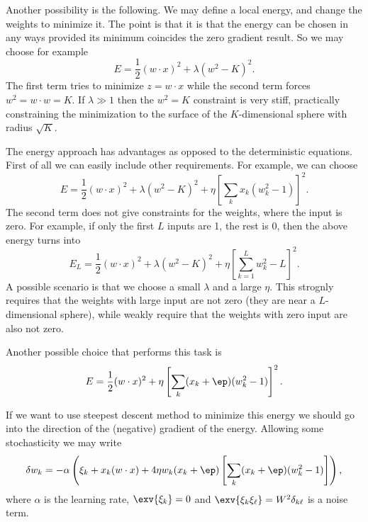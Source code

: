 \documentclass[10pt,a4paper]{article}
\begin{document}
Another possibility is the following. We may define a local energy, and change the weights to minimize it. The point is that it is that the energy can be chosen in any ways provided its minimum coincides the zero gradient result. So we may choose for example
\begin{equation}
  E = \frac12 (w\cdot x)^2 + \lambda (w^2-K)^2.
\end{equation}
The first term tries to minimize $z=w\cdot x$ while the second term forces $w^2=w\cdot w=K$. If $\lambda\gg1$ then the $w^2=K$ constraint is very stiff, practically constraining the minimization to the surface of the $K$-dimensional sphere with radius $\sqrt{K}$.

The energy approach has advantages as opposed to the deterministic equations. First of all we can easily include other requirements. For example, we can choose
\begin{equation}
  E = \frac12 (w\cdot x)^2 + \lambda (w^2-K)^2 + \eta\left[\sum_k x_k (w_k^2-1)\right]^2.
\end{equation}
The second term does not give constraints for the weights, where the input is zero. For example, if only the first $L$ inputs are 1, the rest is 0, then the above energy turns into
\begin{equation}
  E_L = \frac12 (w\cdot x)^2 + \lambda (w^2-K)^2 + \eta\left[\sum_{k=1}^L w_k^2-L\right]^2.
\end{equation}
A possible scenario is that we choose a small $\lambda$ and a large $\eta$. This strognly requires that the weights with large input are not zero (they are near a $L$-dimensional sphere), while weakly require that the weights with zero input are also not zero.

Another possible choice that performs this task is
\begin{equation}
  E = \frac12 (w\cdot x)^2 + \eta\left[\sum_k (x_k+\ep) (w_k^2-1)\right]^2.
\end{equation}

If we want to use steepest descent method to minimize this energy we should go into the direction of the (negative) gradient of the energy. Allowing some stochasticity we may write
\begin{equation}
  \delta w_k = -\alpha \left(\xi_k+ x_k (w\cdot x) + 4 \eta w_k(x_k+\ep) \left[\sum_k (x_k+\ep) (w_k^2-1)\right]\right),
\end{equation}
where $\alpha$ is the learning rate, $\exv{\xi_k}=0$ and $\exv{\xi_k\xi_\ell}=W^2\delta_{k\ell}$ is a noise term.
\end{document}
